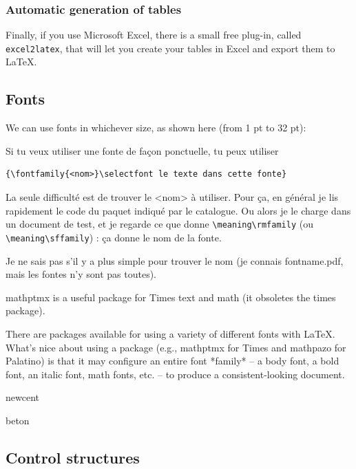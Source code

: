 \documentclass{boostreport}
\begin{document}
\subsubsection{Automatic generation of tables}
\label{sec:autom-gener-tabl}

Finally, if you use Microsoft Excel, there is a small free plug-in, called
\texttt{excel2latex}, that will let you create your tables in Excel and
export them to \LaTeX{}.

\subsection{Fonts}
\label{sec:fonts}

We can use fonts in whichever size, as shown here (from 1 pt to 32 pt):



Si tu veux utiliser une fonte de façon ponctuelle, tu peux utiliser

\begin{verbatim}
{\fontfamily{<nom>}\selectfont le texte dans cette fonte}
\end{verbatim}

La seule difficulté est de trouver le <nom> à utiliser. Pour ça, en général
je lis rapidement le code du paquet indiqué par le catalogue. Ou alors je le
charge dans un document de test, et je regarde ce que donne
\verb|\meaning\rmfamily| (ou \verb|\meaning\sffamily|) : ça donne le nom de
la fonte.

Je ne sais pas s'il y a plus simple pour trouver le nom (je connais
fontname.pdf, mais les fontes n'y sont pas toutes).

mathptmx is a useful package for Times text and math (it obsoletes the times
package).

There are packages available for using a variety of different fonts with
LaTeX. What's nice about using a package (e.g., mathptmx for Times and
mathpazo for Palatino) is that it may configure an entire font *family* -- a
body font, a bold font, an italic font, math fonts, etc. -- to produce a
consistent-looking document.

newcent

beton

\subsection{Control structures}
\label{sec:control-structures}
\end{document}
